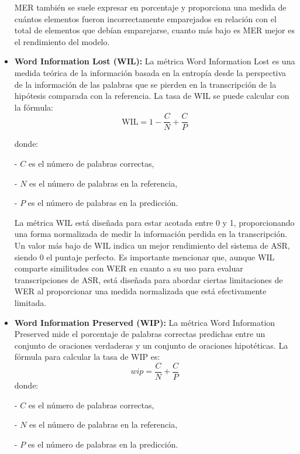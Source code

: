 \documentclass[conference]{IEEEtran}
\begin{document}
\begin{itemize}
    MER también se suele expresar en porcentaje y proporciona una medida de cuántos elementos fueron incorrectamente emparejados en relación con el total de elementos que debían emparejarse, cuanto más bajo es MER mejor es el rendimiento del modelo.
    
    \item \textbf{Word Information Lost (WIL):} La métrica Word Information Lost es una medida teórica de la información basada en la entropía desde la perspectiva de la información de las palabras que se pierden en la transcripción de la hipótesis comparada con la referencia. La tasa de WIL se puede calcular con la fórmula:
    \begin{equation}
        \text{WIL} = 1 - \frac{C}{N} + \frac{C}{P}
    \end{equation}
    
    donde:
    
    - \( C \) es el número de palabras correctas,
    
    - \( N \) es el número de palabras en la referencia,
    
    - \( P \) es el número de palabras en la predicción.
    
    La métrica WIL está diseñada para estar acotada entre 0 y 1, proporcionando una forma normalizada de medir la información perdida en la transcripción. Un valor más bajo de WIL indica un mejor rendimiento del sistema de ASR, siendo 0 el puntaje perfecto. Es importante mencionar que, aunque WIL comparte similitudes con WER en cuanto a su uso para evaluar transcripciones de ASR, está diseñada para abordar ciertas limitaciones de WER al proporcionar una medida normalizada que está efectivamente limitada.
    
    \item \textbf{Word Information Preserved (WIP):} La métrica Word Information Preserved mide el porcentaje de palabras correctas predichas entre un conjunto de oraciones verdaderas y un conjunto de oraciones hipotéticas. La fórmula para calcular la tasa de WIP es:
    \begin{equation}
        wip = \frac{C}{N} + \frac{C}{P}
    \end{equation}
    donde:
    
    - \( C \) es el número de palabras correctas,
    
    - \( N \) es el número de palabras en la referencia,
    
    - \( P \) es el número de palabras en la predicción.
    

\end{itemize}
\end{document}
